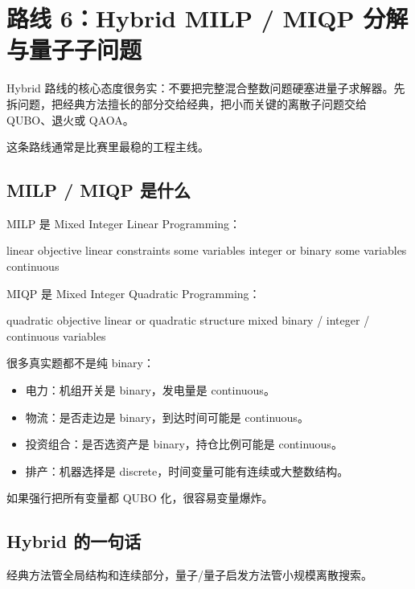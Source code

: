 \documentclass[UTF8,12pt,a4paper]{ctexart}
\begin{document}
\section*{路线 6：Hybrid MILP / MIQP 分解与量子子问题}

Hybrid 路线的核心态度很务实：不要把完整混合整数问题硬塞进量子求解器。先拆问题，把经典方法擅长的部分交给经典，把小而关键的离散子问题交给 QUBO、退火或 QAOA。

这条路线通常是比赛里最稳的工程主线。

\subsection*{MILP / MIQP 是什么}

MILP 是 Mixed Integer Linear Programming：

\begin{GuideVerbatim}
linear objective
linear constraints
some variables integer or binary
some variables continuous
\end{GuideVerbatim}

MIQP 是 Mixed Integer Quadratic Programming：

\begin{GuideVerbatim}
quadratic objective
linear or quadratic structure
mixed binary / integer / continuous variables
\end{GuideVerbatim}

很多真实题都不是纯 binary：

\begin{itemize}
\item 电力：机组开关是 binary，发电量是 continuous。
\item 物流：是否走边是 binary，到达时间可能是 continuous。
\item 投资组合：是否选资产是 binary，持仓比例可能是 continuous。
\item 排产：机器选择是 discrete，时间变量可能有连续或大整数结构。
\end{itemize}

如果强行把所有变量都 QUBO 化，很容易变量爆炸。

\subsection*{Hybrid 的一句话}

\begin{GuideVerbatim}
经典方法管全局结构和连续部分，量子/量子启发方法管小规模离散搜索。
\end{GuideVerbatim}
\end{document}
